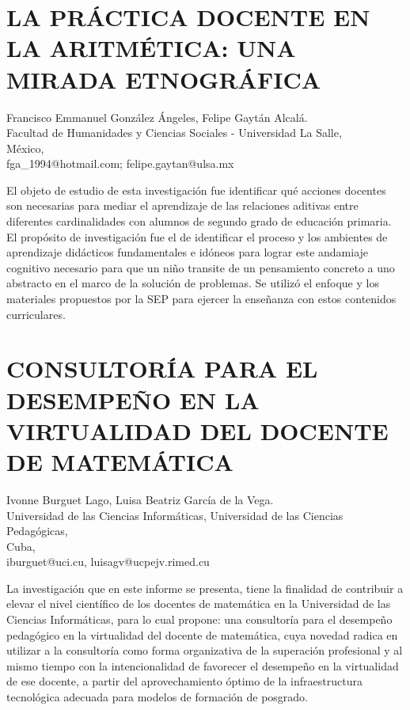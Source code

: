 \section{LA PRÁCTICA DOCENTE EN LA ARITMÉTICA: UNA MIRADA ETNOGRÁFICA }

\begin{datos}
Francisco Emmanuel González Ángeles, Felipe Gaytán Alcalá.\\
Facultad de Humanidades y Ciencias Sociales - Universidad La Salle,\\
\hfill México, \\
\hfill fga\_{}1994@hotmail.com; felipe.gaytan@ulsa.mx
\end{datos}

El objeto de estudio de esta investigación fue identificar qué acciones
docentes son necesarias para mediar el aprendizaje de las relaciones
aditivas entre diferentes cardinalidades con alumnos de segundo grado
de educación primaria. El propósito de investigación fue el de identificar
el proceso y los ambientes de aprendizaje didácticos fundamentales
e idóneos para lograr este andamiaje cognitivo necesario para que
un niño transite de un pensamiento concreto a uno abstracto en el
marco de la solución de problemas. Se utilizó el enfoque y los materiales
propuestos por la SEP para ejercer la enseñanza con estos contenidos
curriculares. 


\section{CONSULTORÍA PARA EL DESEMPEÑO EN LA VIRTUALIDAD DEL DOCENTE DE MATEMÁTICA}

\begin{datos}
Ivonne Burguet Lago, Luisa Beatriz García de la Vega.\\
Universidad de las Ciencias Informáticas, Universidad de las Ciencias Pedagógicas,\\
\hfill Cuba, \\
\hfill iburguet@uci.cu, luisagv@ucpejv.rimed.cu
\end{datos}

La investigación que en este informe se presenta, tiene la finalidad
de contribuir a elevar el nivel científico de los docentes de matemática
en la Universidad de las Ciencias Informáticas, para lo cual propone:
una consultoría para el desempeño pedagógico en la virtualidad del
docente de matemática, cuya novedad radica en utilizar a la consultoría
como forma organizativa de la superación profesional y al mismo tiempo
con la intencionalidad de favorecer el desempeño en la virtualidad
de ese docente, a partir del aprovechamiento óptimo de la infraestructura
tecnológica adecuada para modelos de formación de posgrado.


